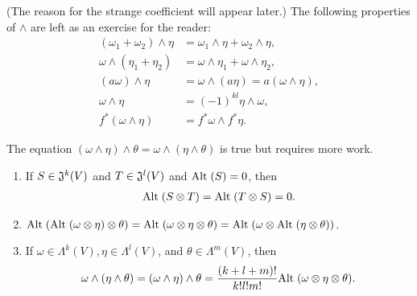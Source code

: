 (The reason for the strange coefficient will appear later.) The following properties of 
$\wedge$ are left as an exercise for the reader:
\begin{align*}
    (\omega_1+\omega_2)\wedge \eta & = \omega_1\wedge\eta + \omega_2\wedge\eta, \\
    \omega\wedge(\eta_1+\eta_2) & = \omega\wedge\eta_1 + \omega\wedge\eta_2, \\
    (a\omega)\wedge\eta & = \omega\wedge(a\eta) = a(\omega\wedge\eta), \\
    \omega\wedge\eta & = (-1)^{kl}\eta\wedge\omega, \\
    f^*(\omega\wedge\eta) & = f^*\omega\wedge f^*\eta.
\end{align*}

The equation $(\omega\wedge\eta)\wedge\theta = \omega\wedge(\eta\wedge\theta)$ is true 
but requires more work.

\begin{theorem}
    \begin{enumerate}[label=\upshape{(\arabic*)}]
        \item If $S\in \mathfrak{J}^k(V)$ and $T\in \mathfrak{J}^l(V)$ and $\mathrm{Alt}\;(S) =0$, then 
            \begin{align*}
                \mathrm{Alt}\;(S\otimes T) = \mathrm{Alt}\;(T\otimes S) = 0.
            \end{align*}
        \item $\mathrm{Alt}\;(\mathrm{Alt}\; (\omega\otimes\eta)\otimes\theta) = \mathrm{Alt}\;(\omega\otimes\eta\otimes\theta)
            = \mathrm{Alt}\;(\omega\otimes\mathrm{Alt}\;(\eta\otimes\theta))$.
        \item If $\omega\in \Lambda^k(V), \eta\in \Lambda^l(V)$, and $\theta\in \Lambda^m(V)$, then 
            \begin{align*}
                \omega\wedge(\eta\wedge\theta) 
                = (\omega\wedge\eta)\wedge\theta 
                = \frac{(k+l+m)!}{k!l!m!}\mathrm{Alt}\;(\omega\otimes\eta\otimes\theta).
            \end{align*}
    \end{enumerate}
\end{theorem}

